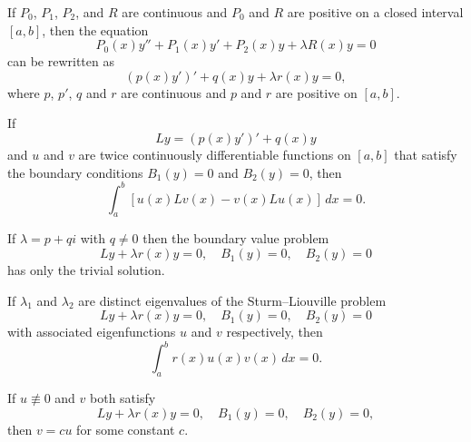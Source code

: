 \setcounter{theorem}{0}
\setcounter{equation}{4}
\begin{theorem}
  \label{thmtype:13.2.1} If $P_{0}$, $P_{1}$, $P_{2}$, and $R$ are continuous and $P_{0}$ and $R$
  are positive on a closed interval $[a,b]$, then the equation
  \begin{equation}
    \label{eq:13.2.5}P_{0}(x)y''+P_{1}(x)y'+P_{2}(x)y+\lambda R(x)y=0
  \end{equation}
  can be rewritten as
  \begin{equation}
    \label{eq:13.2.6}(p(x)y')'+q(x)y+\lambda r(x)y=0,
  \end{equation}
  where $p$, $p'$, $q$ and $r$ are continuous and $p$ and $r$ are positive on $[a,b]$.
\end{theorem}

\setcounter{theorem}{1}
\setcounter{equation}{20}
\begin{theorem}
  \label{thmtype:13.2.2} If
  \[
    Ly=(p(x)y')'+q(x)y
  \]
  and $u$ and $v$ are twice continuously differentiable functions on $[a,b]$ that satisfy the boundary conditions
  $B_{1}(y)=0$ and $B_{2}(y)=0$, then
  \begin{equation}
    \label{eq:13.2.21}\int_{a}^{b}[u(x)Lv(x)-v(x)Lu(x)]\,dx=0.
  \end{equation}
\end{theorem}

\setcounter{theorem}{2}
\begin{theorem}
  \label{thmtype:13.2.3} If $\lambda=p+qi$ with $q\ne0$ then the boundary value problem
  \[
    Ly+\lambda r(x)y=0,\quad B_{1}(y)=0,\quad B_{2}(y)=0
  \]
  has only the trivial solution.
\end{theorem}

\setcounter{theorem}{3}
\setcounter{equation}{24}
\begin{theorem}
  \label{thmtype:13.2.4} If $\lambda_{1}$ and $\lambda_{2}$ are distinct eigenvalues of the
  Sturm--Liouville problem
  \begin{equation}
    \label{eq:13.2.25}Ly+\lambda r(x)y=0,\quad B_{1}(y)=0,\quad B_{2}(y)=0
  \end{equation}
  with associated eigenfunctions $u$ and $v$ respectively, then
  \begin{equation}
    \label{eq:13.2.26}\int_{a}^{b}r(x)u(x)v(x)\,dx=0.
  \end{equation}
\end{theorem}

\setcounter{theorem}{4}
\begin{theorem}
  \label{thmtype:13.2.5} If $u\not\equiv0$ and $v$ both satisfy
  \[
    Ly+\lambda r(x)y=0,\quad B_{1}(y)=0,\quad B_{2}(y)=0,
  \]
  then $v=cu$ for some constant $c$.
\end{theorem}

